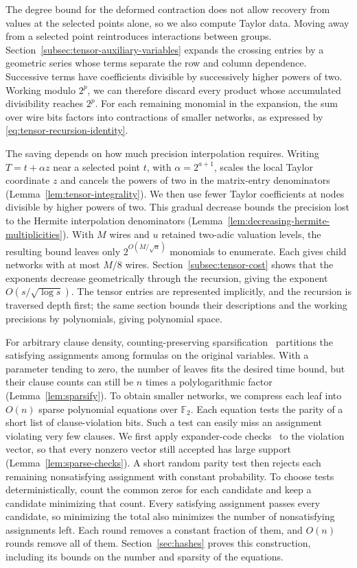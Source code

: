 \documentclass[11pt,reqno]{amsart}
\numberwithin{equation}{section}
\theoremstyle{definition}\newtheorem{definition}[theorem]{Definition}
\theoremstyle{remark}\newtheorem{remark}[theorem]{Remark}
\begin{document}
The degree bound for the deformed contraction does not allow recovery
from values at the selected points alone, so we also compute Taylor
data. Moving away from a selected point reintroduces interactions
between groups.
Section~\ref{subsec:tensor-auxiliary-variables} expands the crossing entries by a
geometric series whose terms separate the row and column dependence.
Successive terms have coefficients divisible by successively higher
powers of two. Working modulo $2^p$, we can therefore discard every
product whose accumulated divisibility reaches $2^p$. For each
remaining monomial in the expansion, the sum over wire bits factors
into contractions of smaller networks, as expressed by
\eqref{eq:tensor-recursion-identity}.

The saving depends on how much precision interpolation requires.
Writing $T=t+\alpha z$ near a selected point $t$, with
$\alpha=2^{a+1}$, scales the local Taylor coordinate $z$ and cancels
the powers of two in the matrix-entry denominators
(Lemma~\ref{lem:tensor-integrality}). We
then use fewer Taylor coefficients at nodes divisible by higher
powers of two. This gradual decrease bounds the precision lost to
the Hermite interpolation denominators
(Lemma~\ref{lem:decreasing-hermite-multiplicities}). With $M$ wires and $u$ retained
two-adic valuation levels, the resulting bound leaves only
$2^{O(M/\sqrt u)}$ monomials to enumerate. Each gives child networks
with at most $M/8$ wires. Section~\ref{subsec:tensor-cost} shows that
the exponents decrease geometrically through the recursion, giving the
exponent $O(s/\sqrt{\log s})$. The tensor entries are represented
implicitly, and the recursion is traversed depth first; the same
section bounds their descriptions and the working precisions by
polynomials, giving polynomial space.

For arbitrary clause density, counting-preserving
sparsification~\cite[Appendix~A]{DHMTW} partitions the satisfying
assignments among formulas on the original variables. With a
parameter tending to zero, the number of leaves fits the desired
time bound, but their clause counts can still be $n$ times a
polylogarithmic factor (Lemma~\ref{lem:sparsify}). To obtain smaller
networks, we compress each leaf into $O(n)$ sparse polynomial
equations over $\mathbb F_2$. Each equation tests the parity of a
short list of clause-violation bits. Such a test can easily miss an
assignment violating very few clauses. We first apply expander-code
checks~\cite[Sections~IV and~VI]{SS96} to the violation vector, so
that every nonzero vector still accepted has large support
(Lemma~\ref{lem:sparse-checks}). A short random parity test then
rejects each remaining nonsatisfying assignment with constant
probability. To choose tests deterministically, count the common
zeros for each candidate and keep a candidate minimizing that count.
Every satisfying assignment passes every candidate, so minimizing
the total also minimizes the number of nonsatisfying assignments
left. Each round removes a constant fraction of them, and $O(n)$
rounds remove all of them. Section~\ref{sec:hashes} proves this
construction, including its bounds on the number and sparsity of
the equations.
\end{document}
